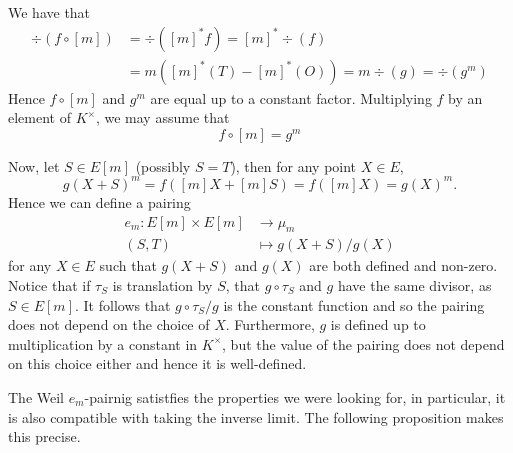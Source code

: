 We have that
\begin{align*}
	\div(f\circ [m]) &= \div([m]^*f) = [m]^*\div(f) \\
	&= m\left([m]^*(T) - [m]^*(O)\right) = m\div(g) = \div(g^m)
\end{align*}
Hence $f\circ[m]$ and $g^m$ are equal up to a constant factor. Multiplying $f$
by an element of $K^\times$, we may assume that
\begin{equation*}
	f\circ [m] = g^m
\end{equation*}

Now, let $S \in E[m]$ (possibly $S = T$), then for any point $X \in E$,
\begin{equation*}
	g(X + S)^m = f([m]X + [m]S) = f([m]X) = g(X)^m.
\end{equation*}
Hence we can define a pairing
\begin{align*}
	e_m: E[m] \times E[m] &\to \mu_m\\
	(S, T) &\mapsto g(X + S)/g(X)
\end{align*}
for any $X \in E$ such that $g(X + S)$ and $g(X)$ are both defined and
non-zero. Notice that if $\tau_S$ is translation by $S$, that 
$g\circ \tau_S$ and $g$ have the same divisor, as $S \in E[m]$. It follows that 
$g\circ \tau_S/g$ is the constant function and so the pairing does not depend on
the choice of $X$. Furthermore, $g$ is defined up to multiplication by a
constant in $K^\times$, but the value of the pairing does not depend on this
choice either and hence it is well-defined.

The Weil $e_m$-pairnig satistfies the properties we were looking for,
in particular, it is also compatible with taking the inverse limit.
The following proposition makes this precise.

